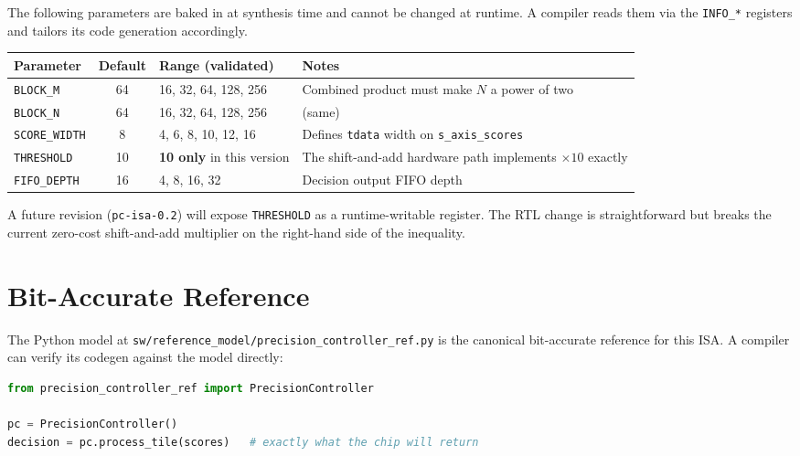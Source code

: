 \documentclass[11pt]{article}
\begin{document}
The following parameters are baked in at synthesis time and cannot be changed
at runtime. A compiler reads them via the \texttt{INFO\_*} registers and
tailors its code generation accordingly.

\begin{table}[h]
\centering
\small
\begin{tabular}{@{}l c l p{5.5cm}@{}}
\toprule
Parameter         & Default & Range (validated)                & Notes \\
\midrule
\texttt{BLOCK\_M}     & 64  & 16, 32, 64, 128, 256              & Combined product must make $N$ a power of two \\
\texttt{BLOCK\_N}     & 64  & 16, 32, 64, 128, 256              & (same) \\
\texttt{SCORE\_WIDTH} & 8   & 4, 6, 8, 10, 12, 16               & Defines \texttt{tdata} width on \texttt{s\_axis\_scores} \\
\texttt{THRESHOLD}    & 10  & \textbf{10 only} in this version  & The shift-and-add hardware path implements $\times 10$ exactly \\
\texttt{FIFO\_DEPTH}  & 16  & 4, 8, 16, 32                      & Decision output FIFO depth \\
\bottomrule
\end{tabular}
\end{table}

\noindent
A future revision (\texttt{pc-isa-0.2}) will expose \texttt{THRESHOLD} as a
runtime-writable register. The RTL change is straightforward but breaks the
current zero-cost shift-and-add multiplier on the right-hand side of the
inequality.

\section{Bit-Accurate Reference}
\label{sec:ref}

The Python model at
\texttt{sw/reference\_model/precision\_controller\_ref.py} is the canonical
bit-accurate reference for this ISA. A compiler can verify its codegen
against the model directly:

\begin{lstlisting}[language=Python]
from precision_controller_ref import PrecisionController

pc = PrecisionController()
decision = pc.process_tile(scores)   # exactly what the chip will return
\end{lstlisting}
\end{document}
